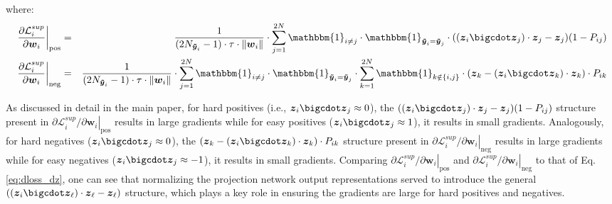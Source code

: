 where:
\begin{eqnarray}
  \left.\frac{\partial\mathcal{L}_i^{sup}}{\partial\boldsymbol{w}_i}\right\vert_\text{pos} & = & \frac{1}{(2N_{\boldsymbol{\tilde{y}}_i}-1)\cdot\tau\cdot\Vert\boldsymbol{w}_i\Vert}\cdot\sum_{j=1}^{2N}\mathbbm{1}_{i\neq j}\cdot\mathbbm{1}_{\boldsymbol{\tilde{y}}_i=\boldsymbol{\tilde{y}}_j}\cdot
  ((\boldsymbol{z}_i\bigcdot\boldsymbol{z}_j)\cdot\boldsymbol{z}_j-\boldsymbol{z}_j)(1-P_{ij}) \nonumber \\
  \left.\frac{\partial\mathcal{L}_i^{sup}}{\partial\boldsymbol{w}_i}\right\vert_\text{neg} & = & \frac{1}{(2N_{\boldsymbol{\tilde{y}}_i}-1)\cdot\tau\cdot\Vert\boldsymbol{w}_i\Vert}\cdot\sum_{j=1}^{2N}\mathbbm{1}_{i\neq j}\cdot\mathbbm{1}_{\boldsymbol{\tilde{y}}_i=\boldsymbol{\tilde{y}}_j}\cdot
  \sum_{k=1}^{2N}\mathbbm{1}_{k\notin\{i,j\}}\cdot(\boldsymbol{z}_k-(\boldsymbol{z}_i\bigcdot\boldsymbol{z}_k)\cdot\boldsymbol{z}_k)\cdot P_{ik} \nonumber
\end{eqnarray}

As discussed in detail in the main paper, for hard positives (i.e., $\boldsymbol{z}_i\bigcdot\boldsymbol{z}_j\approx0$), the $((\boldsymbol{z}_i\bigcdot\boldsymbol{z}_j)\cdot\boldsymbol{z}_j-\boldsymbol{z}_j)(1-P_{ij})$ structure present in $\left.\partial\mathcal{L}_i^{sup}/\partial\boldsymbol{w}_i\right\vert_\text{pos}$ results in large gradients while for easy positives ($\boldsymbol{z}_i\bigcdot\boldsymbol{z}_j\approx1$), it results in small gradients. Analogously, for hard negatives ($\boldsymbol{z}_i\bigcdot\boldsymbol{z}_j\approx0$), the $(\boldsymbol{z}_k-(\boldsymbol{z}_i\bigcdot\boldsymbol{z}_k)\cdot\boldsymbol{z}_k)\cdot P_{ik}$ structure present in $\left.\partial\mathcal{L}_i^{sup}/\partial\boldsymbol{w}_i\right\vert_\text{neg}$ results in large gradients while for easy negatives ($\boldsymbol{z}_i\bigcdot\boldsymbol{z}_j\approx-1$), it results in small gradients. Comparing $\left.\partial\mathcal{L}_i^{sup}/\partial\boldsymbol{w}_i\right\vert_\text{pos}$ and $\left.\partial\mathcal{L}_i^{sup}/\partial\boldsymbol{w}_i\right\vert_\text{neg}$ to that of Eq. \ref{eq:dloss_dz}, one can see that normalizing the projection network output representations served to introduce the general $((\boldsymbol{z}_i\bigcdot\boldsymbol{z}_\ell)\cdot\boldsymbol{z}_{\ell}-\boldsymbol{z}_{\ell})$ structure, which plays a key role in ensuring the gradients are large for hard positives and negatives.